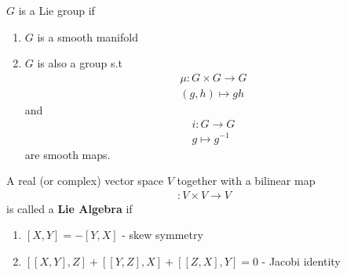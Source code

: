 \documentclass[12pt,a4paper]{article}
\theoremstyle{definition}
\theoremstyle{greenbox}
\begin{document}
    \begin{defn}
        $ G $ is a Lie group if \begin{enumerate}
            \item $ G $ is a smooth manifold
            \item $ G $ is also a group s.t 
            \begin{align*}
                \mu : G \times G \to G \\
                ( g,h) \mapsto gh
            \end{align*} and 
            \begin{align*}
                i : G \to G \\
                g \mapsto g^{-1}
            \end{align*}
            are smooth maps.
        \end{enumerate}
    \end{defn}
    \begin{defn}
        A real (or complex) vector space $ V $ together with a bilinear map \begin{align*}
            [,] : V \times V \to V
        \end{align*}
        is called a \textbf{Lie Algebra} if \begin{enumerate}
            \item $[X,Y] = -[Y,X]$ - skew symmetry
            \item $[[X,Y],Z]+ [[Y,Z],X]+ [[Z,X],Y] = 0 $ - Jacobi identity
        \end{enumerate}
    \end{defn}
\end{document}
